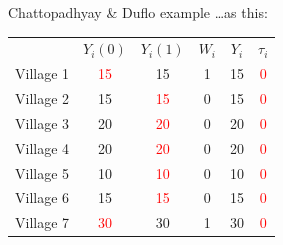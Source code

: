 \documentclass[xcolor={dvipsnames},handout]{beamer}
\begin{document}

\begin{frame}{Chattopadhyay \& Duflo example}
\dots as this:

\begin{table}[]
\begin{tabular}{lccccc}
& $Y_i(0)$ & $Y_i(1)$ & $W_i$ & $Y_i$ &$\tau_i$ \\
Village 1 & \textcolor{red}{15} & 15 & 1 & 15 & \textcolor{red}{0} \\
Village 2 & 15 & \textcolor{red}{15} & 0 & 15 & \textcolor{red}{0} \\
Village 3 & 20 & \textcolor{red}{20} & 0 & 20 & \textcolor{red}{0} \\
Village 4 & 20 & \textcolor{red}{20} & 0 & 20 & \textcolor{red}{0} \\
Village 5 & 10 & \textcolor{red}{10} & 0 & 10 & \textcolor{red}{0} \\
Village 6 & 15 & \textcolor{red}{15} & 0 & 15 & \textcolor{red}{0} \\
Village 7 & \textcolor{red}{30} & 30 & 1 & 30 & \textcolor{red}{0}
\end{tabular}
\end{table}

\end{frame}


\end{document}
